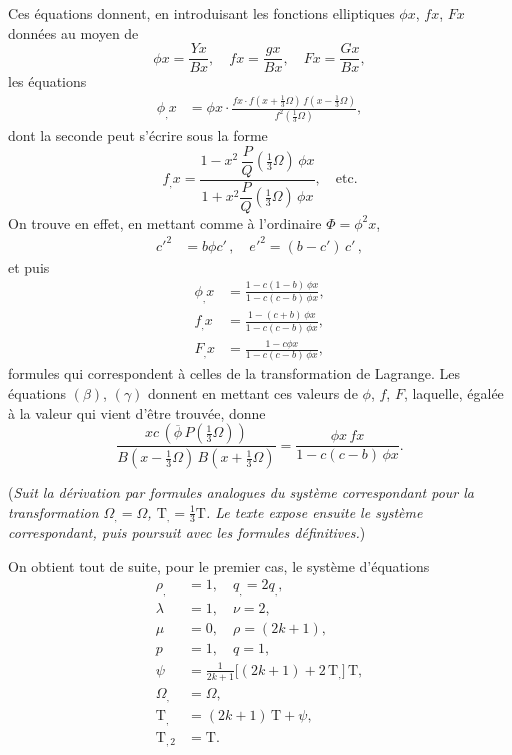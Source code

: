 \documentclass[11pt,a4paper]{article}
\begin{document}
Ces \'equations donnent, en introduisant les fonctions elliptiques $\phi x$, $fx$, $Fx$ donn\'ees au moyen de
\[
\phi x = \frac{Yx}{Bx},\quad fx = \frac{gx}{Bx},\quad Fx = \frac{Gx}{Bx},
\]
les \'equations
\begin{align*}
\phi_{,} x &= \phi x\cdot\frac{f x\cdot f(x + \tfrac{1}{3}\Omega)\, f(x - \tfrac{1}{3}\Omega)}{f^2(\tfrac{1}{3}\Omega)},
\end{align*}
dont la seconde peut s'\'ecrire sous la forme
\[
f_{,} x = \frac{1 - x^2\,\dfrac{P}{Q}(\tfrac{1}{3}\Omega)\,\phi x}{1 + x^2 \dfrac{P}{Q}(\tfrac{1}{3}\Omega)\,\phi x},\quad \text{etc.}
\]
On trouve en effet, en mettant comme \`a l'ordinaire $\Phi = \phi^2 x$,
\begin{align*}
c'^2 &= b\phi c'\,,\quad
e'^2 = (b - c')\,c'\,,
\end{align*}
et puis
\begin{align*}
\phi_{,} x &= \frac{1 - c(1 - b)\,\phi x}{1 - c(c - b)\,\phi x},\\
f_{,} x &= \frac{1 - (c + b)\,\phi x}{1 - c(c - b)\,\phi x},\\
F_{,} x &= \frac{1 - c\phi x}{1 - c(c - b)\,\phi x},
\end{align*}
formules qui correspondent \`a celles de la transformation de Lagrange. Les \'equations $(\beta)$, $(\gamma)$ donnent en mettant ces valeurs de $\phi$, $f$, $F$, laquelle, \'egal\'ee \`a la valeur qui vient d'\^etre trouv\'ee, donne
\[
\frac{xc\,(\overline{\phi}\,P(\tfrac{1}{3}\Omega))}{B(x - \tfrac{1}{3}\Omega)\,B(x + \tfrac{1}{3}\Omega)} = \frac{\phi x\,fx}{1 - c(c - b)\,\phi x}.
\]

\medskip

\noindent (\textit{Suit la d\'erivation par formules analogues du syst\`eme correspondant pour la transformation $\Omega_{,} = \Omega$, $\mathrm{T}_{,} = \tfrac{1}{3}\mathrm{T}$. Le texte expose ensuite le syst\`eme correspondant, puis poursuit avec les formules d\'efinitives.})

\medskip

On obtient tout de suite, pour le premier cas, le syst\`eme d'\'equations
\begin{align*}
\rho_{,} &= 1,\quad q_{,} = 2q_{,},\\
\lambda &= 1,\quad \nu = 2,\\
\mu &= 0,\quad \rho = (2k+1),\\
p &= 1,\quad q = 1,\\
\psi &= \tfrac{1}{2k+1}\bigl[(2k+1) + 2\,\mathrm{T}_{,}\bigr]\,\mathrm{T},\\
\Omega_{,} &= \Omega,\\
\mathrm{T}_{,} &= (2k+1)\,\mathrm{T} + \psi,\\
\mathrm{T}_{,2} &= \mathrm{T}.
\end{align*}
\end{document}
